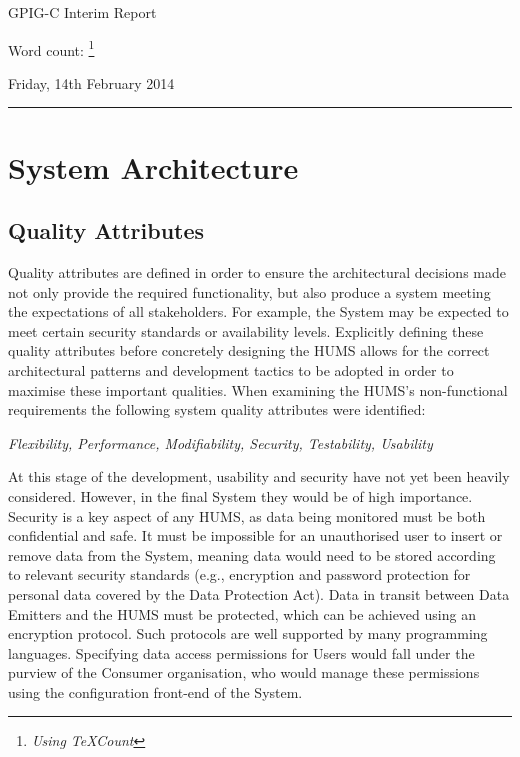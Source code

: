 \documentclass[10pt,a4paper]{article}
\begin{document}
\begin{center}
{\Large GPIG-C Interim Report}

Word count: \unskip
\footnote{\textit{Using TeXCount}}

Friday, 14th February 2014
\end{center}

\vspace{0.3cm}
\rule{\textwidth}{0.4pt}




\section{System Architecture}
\label{sec:architecture}

\subsection{Quality Attributes}
\label{sec:architecture-quality}

Quality attributes are defined in order to ensure the architectural decisions 
made not only provide the required functionality, but also produce a system
meeting the expectations of all stakeholders. For example, the System may be expected to meet certain security standards or availability levels. Explicitly defining these quality attributes before concretely designing the HUMS allows for the correct architectural patterns and development tactics to be adopted in order to maximise these important qualities.
When examining the HUMS's non-functional requirements the 
following system quality attributes were identified:
	\begin{center}
	\textit{Flexibility, Performance, Modifiability, Security, 
Testability, Usability}
	\end{center}
At this stage of the development, usability and security 
have not yet been heavily considered. However, in the final System they 
would be of high importance. Security is a key aspect of any HUMS, 
as data being monitored must be both confidential and safe. It must be impossible for an unauthorised user to insert or remove data from the System, meaning data would need to be stored according to relevant security standards  (e.g., encryption and password protection for personal data covered by the Data Protection Act). Data in transit between Data Emitters and the HUMS must be protected, which can be achieved using an encryption protocol. Such protocols are well supported by many programming languages. Specifying data access permissions for Users would fall under the purview of the Consumer organisation, who would manage these permissions using the configuration front-end of the System.
\end{document}
